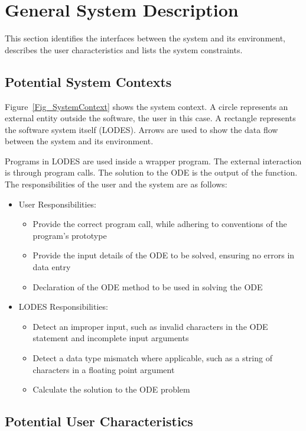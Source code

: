 \documentclass[12pt]{article}
\newcommand{\progname}{LODES} %
\begin{document}
\section{General System Description}

This section identifies the interfaces between the system and its environment,
describes the user characteristics and lists the system constraints.

\subsection{Potential System Contexts}

Figure~\ref{Fig_SystemContext} shows the system context.  A circle represents an
external entity outside the software, the user in this case.  A rectangle
represents the software system itself (\progname{}).  Arrows are used to show the data
flow between the system and its environment.

Programs in \progname{} are used inside a wrapper program.  The external interaction is through
program calls. The solution to the ODE is the output of the function.  The responsibilities of
the user and the system are as follows:

\begin{itemize}
\item User Responsibilities:
\begin{itemize}
\item Provide the correct program call, while adhering to conventions of the program's prototype
\item Provide the input details of the ODE to be solved, ensuring no errors in data entry
\item Declaration of the ODE method to be used in solving the ODE
\end{itemize}
\item \progname{} Responsibilities:
\begin{itemize}
\item Detect an improper input, such as invalid characters in the ODE statement and incomplete input arguments
\item Detect a data type mismatch where applicable, such as a string of characters in a floating point argument
\item Calculate the solution to the ODE problem
\end{itemize}
\end{itemize}

\subsection{Potential User Characteristics} \label{SecUserCharacteristics}
\end{document}
